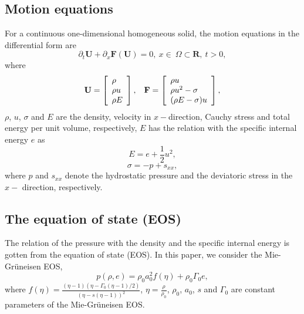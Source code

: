 \documentclass{article}
\numberwithin{equation}{section}
\numberwithin{table}{section}
\begin{document}
\subsection{Motion equations}
For  a continuous one-dimensional homogeneous solid, the motion equations  in  the  differential form are
\begin{equation*}
\partial_t \mathbf{{U}} + \partial _x \bm{F}(\mathbf{{U}}) = 0, \   x \in \   \Omega \subset \mathbf{R}, \  t>0,
\end{equation*}
where
\begin{equation}
  \mathbf{U} = \left[ \begin{array}{l}
      \rho \\
      \rho u \\
      \rho  E \\
    \end{array}
  \right],
  \hspace{0.3cm}
  \mathbf{F} = \left[ \begin{array}{l}
      \rho u \\
      \rho u^2 -\sigma\\
      (\rho E -\sigma)u\\
  \end{array} \right],
\end{equation}
$\rho$, $u$, $\sigma$ and $E$ are  the density, velocity in $x-$direction, Cauchy stress and total energy per unit volume, respectively, $E$ has the relation with the  specific internal energy $e$ as
\begin{equation} \label{te1}
  E = e+\frac{1}{2}u^2,
\end{equation}
\begin{equation}\label{sigma1}
  \sigma = -p +s_{xx},
\end{equation}
where $p$ and $s_{xx}$ denote the  hydrostatic pressure and the deviatoric stress in the $x-$ direction, respectively.

\subsection{The equation of state (EOS)}

The relation of the pressure with  the density and the specific internal energy is gotten from the equation of state (EOS). In this paper, we consider the Mie-Gr\"uneisen EOS,
\begin{equation}\label{eq:mie}
  p(\rho,e) = \rho_0 a_0^2f(\eta)+ \rho_0 \Gamma_0 e,
\end{equation}
where $f(\eta) = \frac{(\eta-1)(\eta-\Gamma_0(\eta-1)/2)}{(\eta-s(\eta-1))^2}$, $\eta = \frac{\rho}{\rho_0}$, $\rho_0$, $a_0$, $s$ and $\Gamma_0$ are constant parameters of the Mie-Gr\"uneisen EOS.
\end{document}

